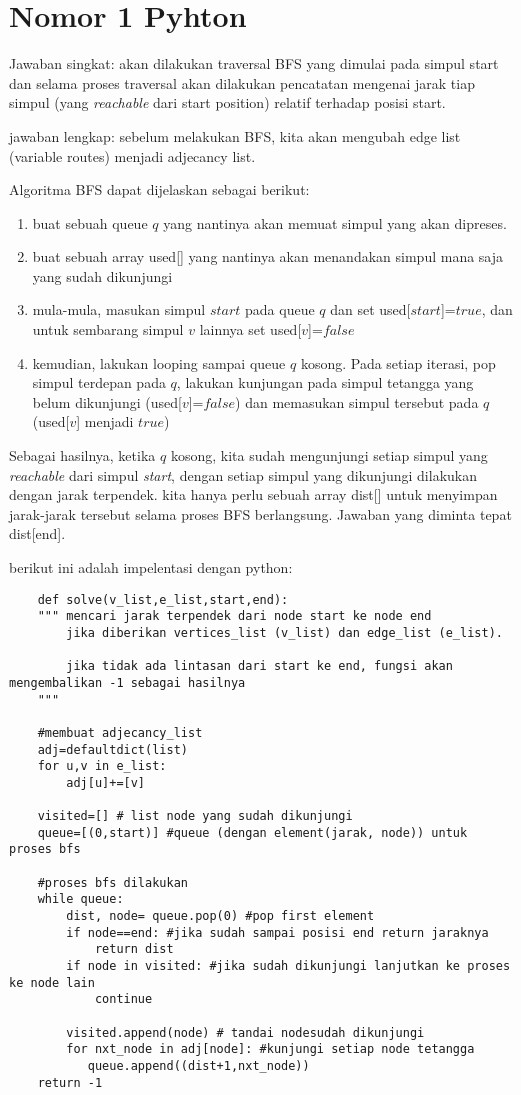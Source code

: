 \documentclass[12pt,letterpaper]{article}
\begin{document}
\section{Nomor 1 Pyhton}
Jawaban singkat: akan dilakukan traversal BFS yang dimulai pada simpul start dan selama proses traversal
akan dilakukan pencatatan mengenai jarak tiap simpul (yang \textit{reachable} dari start position) relatif terhadap posisi start.
\vline

 jawaban lengkap: sebelum melakukan BFS, kita akan mengubah edge list (variable routes) menjadi adjecancy list. 

Algoritma BFS dapat dijelaskan sebagai berikut:
\begin{enumerate}
    \item buat sebuah queue $q$ yang nantinya akan memuat simpul yang akan dipreses.
    \item buat sebuah array used[] yang nantinya akan menandakan simpul mana saja yang sudah dikunjungi
    \item  mula-mula, masukan simpul $start$ pada queue $q$ dan set used[$start$]=$true$, dan untuk sembarang simpul $v$ lainnya set used[$v$]=$false$
    \item kemudian, lakukan looping sampai queue $q$ kosong. Pada setiap iterasi, pop simpul terdepan pada $q$, lakukan kunjungan pada simpul tetangga yang belum dikunjungi (used[$v$]=$false$) dan memasukan simpul tersebut pada $q$ (used[$v$] menjadi $true$)
\end{enumerate}
Sebagai hasilnya, ketika $q$ kosong, kita sudah mengunjungi setiap simpul yang \textit{reachable} dari simpul \textit{start}, dengan setiap simpul yang dikunjungi dilakukan dengan jarak terpendek.
kita hanya perlu sebuah array dist[] untuk menyimpan jarak-jarak tersebut selama proses BFS berlangsung. Jawaban yang diminta tepat dist[end].

berikut ini adalah impelentasi dengan python:

\break 
\begin{lstlisting}
    def solve(v_list,e_list,start,end):
    """ mencari jarak terpendek dari node start ke node end
        jika diberikan vertices_list (v_list) dan edge_list (e_list).

        jika tidak ada lintasan dari start ke end, fungsi akan mengembalikan -1 sebagai hasilnya
    """

    #membuat adjecancy_list
    adj=defaultdict(list)
    for u,v in e_list:
        adj[u]+=[v]

    visited=[] # list node yang sudah dikunjungi
    queue=[(0,start)] #queue (dengan element(jarak, node)) untuk proses bfs

    #proses bfs dilakukan
    while queue:
        dist, node= queue.pop(0) #pop first element
        if node==end: #jika sudah sampai posisi end return jaraknya
            return dist
        if node in visited: #jika sudah dikunjungi lanjutkan ke proses ke node lain
            continue

        visited.append(node) # tandai nodesudah dikunjungi
        for nxt_node in adj[node]: #kunjungi setiap node tetangga
           queue.append((dist+1,nxt_node))
    return -1

\end{lstlisting}
\end{document}

